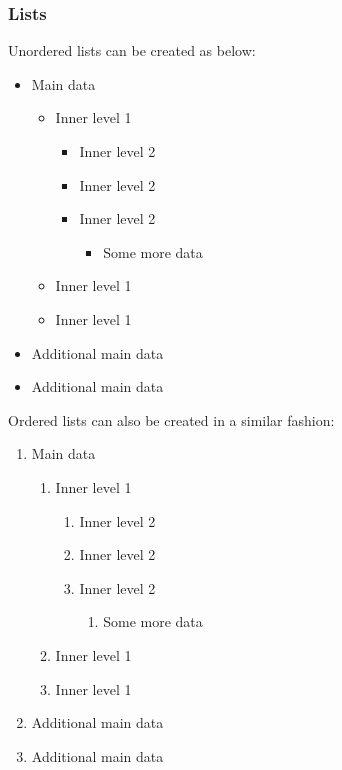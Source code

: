 \subsubsection{Lists}

Unordered lists can be created as below: 

\begin{itemize}
    \item Main data
    \begin{itemize}
        \item Inner level 1
        \begin{itemize}
            \item Inner level 2
            \item Inner level 2
            \item Inner level 2
            \begin{itemize}
                \item Some more data
            \end{itemize}
        \end{itemize}
        \item Inner level 1
        \item Inner level 1
    \end{itemize}
    \item Additional main data
    \item Additional main data
\end{itemize}


Ordered lists can also be created in a similar fashion:

\begin{enumerate}
    \item Main data
    \begin{enumerate}
        \item Inner level 1
        \begin{enumerate}
            \item Inner level 2
            \item Inner level 2
            \item Inner level 2
            \begin{enumerate}
                \item Some more data
            \end{enumerate}
        \end{enumerate}
        \item Inner level 1
        \item Inner level 1
    \end{enumerate}
    \item Additional main data
    \item Additional main data
\end{enumerate} \\

